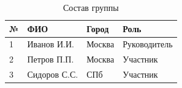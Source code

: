 \begin{table}[H]
\centering
\begin{tabular}{llll}
\toprule
№ & ФИО & Город & Роль \\
\midrule
1 & Иванов И.И. & Москва & Руководитель \\
2 & Петров П.П. & Москва & Участник \\
3 & Сидоров С.С. & СПб & Участник \\
\bottomrule
\end{tabular}
\caption{Состав группы}
\end{table}